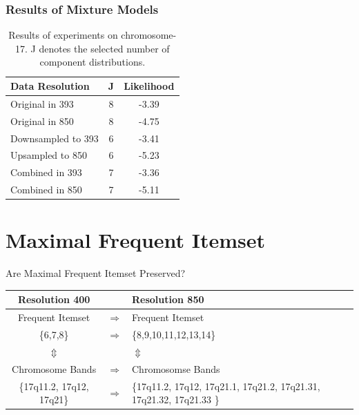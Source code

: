 \documentclass[dvips]{beamer}
\begin{document}
\begin{frame}
\frametitle{Results of Mixture Models}
\begin{table}[h!]
  \centering
  \begin{tabular}{|l|c|c|}
    \hline
    \textbf{Data Resolution} & \textbf{J} &\textbf{Likelihood}  \\
    \hline
    Original in 393	&	8	& 	-3.39  \\ \hline
    Original in 850	&	8	& 	-4.75 \\ \hline
    Downsampled to 393	&	6	& 	-3.41  \\ \hline
    Upsampled to 850	&	6	& 	-5.23  \\ \hline
    Combined  in 393	&	7	& 	-3.36  \\ \hline
    Combined in 850	&	7	& 	-5.11  \\ \hline     
  \end{tabular}
  \caption{Results of experiments on chromosome-17. J denotes the selected number of component distributions. }\label{Tab:results}
\end{table}
\end{frame}

\section[MFI]{Maximal Frequent Itemset}
\begin{frame}{Are Maximal Frequent Itemset Preserved?}

\begin{table}[h!]
  \centering
  \begin{tabular}{|c c p{4cm}|}
    \hline
    \textbf{Resolution 400} &   &\textbf{Resolution 850}  \\
    \hline
   Frequent Itemset	&	$\Rightarrow$	& \hspace{0.2cm} Frequent Itemset  \\ 
    \{6,7,8\}	&	$\Rightarrow$	&\{8,9,10,11,12,13,14\}  \\ 
    $\Updownarrow $ 	&		& \hspace{1.5cm}$\Updownarrow $ \\ 
    Chromosome Bands	&	$\Rightarrow$	& \hspace{0.15cm} Chromosomse Bands  \\ 
   \{17q11.2, 17q12, 17q21\} &	$\Rightarrow$	& \{17q11.2, 17q12, 17q21.1, 17q21.2, 17q21.31, 17q21.32, 17q21.33 \}  \\ \hline
    
  \end{tabular}
\end{table}
\end{frame}
\end{document}
